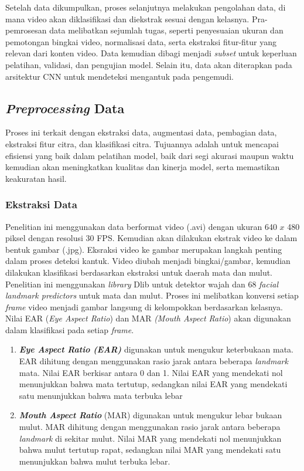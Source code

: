   
    Setelah data dikumpulkan, proses selanjutnya melakukan pengolahan data, di mana video akan diklasifikasi dan diekstrak sesuai dengan kelasnya. Pra-pemrosesan data melibatkan sejumlah tugas, seperti penyesuaian ukuran dan pemotongan bingkai video, normalisasi data, serta ekstraksi fitur-fitur yang relevan dari konten video. Data kemudian dibagi menjadi \textit{subset} untuk keperluan pelatihan, validasi, dan pengujian model. Selain itu, data akan diterapkan pada arsitektur CNN untuk mendeteksi mengantuk pada pengemudi.
    
\subsection{\textit{Preprocessing }Data}
   
    Proses ini terkait dengan ekstraksi data, augmentasi data, pembagian data, ekstraksi fitur citra, dan klasifikasi citra. Tujuannya adalah untuk mencapai efisiensi yang baik dalam pelatihan model, baik dari segi akurasi maupun waktu kemudian akan meningkatkan kualitas dan kinerja model, serta memastikan keakuratan hasil.
    
  
\subsubsection{Ekstraksi Data}
    Penelitian ini menggunakan data berformat video (.avi) dengan ukuran 640 $x$ 480 piksel dengan resolusi 30 FPS. Kemudian akan dilakukan  ekstrak video ke dalam bentuk gambar (.jpg). Eksraksi video ke gambar merupakan langkah penting dalam proses deteksi kantuk. Video diubah menjadi bingkai/gambar, kemudian dilakukan klasifikasi berdasarkan ekstraksi untuk daerah mata dan mulut. Penelitian ini menggunakan \textit{library} Dlib untuk detektor wajah dan 68 \textit{facial landmark predictors} untuk mata dan mulut. Proses ini melibatkan konversi setiap \textit{frame} video menjadi gambar langsung di kelompokkan berdasarkan kelasnya. Nilai EAR (\textit{Eye Aspect Ratio}) dan MAR \textit{(Mouth Aspect Ratio}) akan digunakan dalam klasifikasi pada setiap \textit{frame}.
    
    \begin{enumerate}
        \item     \textit{\textbf{Eye Aspect Ratio (EAR)}} digunakan untuk mengukur keterbukaan mata. EAR dihitung dengan menggunakan rasio jarak antara beberapa\textit{ landmark }mata. Nilai EAR berkisar antara 0 dan 1. Nilai EAR yang mendekati nol menunjukkan bahwa mata tertutup, sedangkan nilai EAR yang mendekati satu menunjukkan bahwa mata terbuka lebar

        \item \textbf{\textit{Mouth Aspect Ratio }}(MAR) digunakan untuk mengukur lebar bukaan mulut. MAR dihitung dengan menggunakan rasio jarak antara beberapa \textit{landmark} di sekitar mulut. Nilai MAR yang mendekati nol menunjukkan bahwa mulut tertutup rapat, sedangkan nilai MAR yang mendekati satu menunjukkan bahwa mulut terbuka lebar. 
    \end{enumerate}

